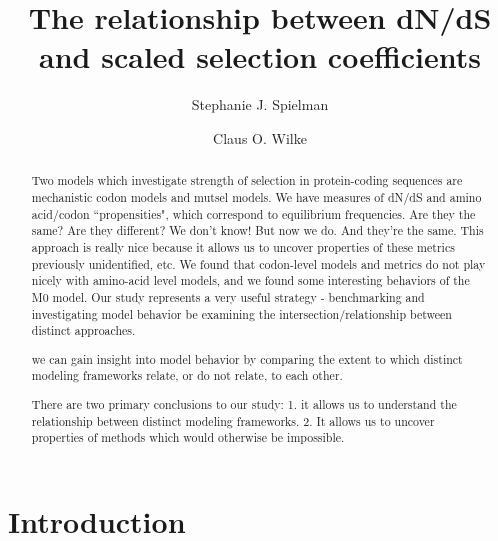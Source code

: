 \documentclass{pnastwo}
\begin{document}
	
	
\title{The relationship between dN/dS and scaled selection coefficients}

\author{Stephanie J. Spielman
	\and
	Claus O. Wilke}


\maketitle



\newpage
\begin{abstract}
Two models which investigate strength of selection in protein-coding sequences are mechanistic codon models and mutsel models. We have measures of dN/dS and amino acid/codon ``propensities", which correspond to equilibrium frequencies. Are they the same? Are they different? We don't know! But now we do. And they're the same. This approach is really nice because it allows us to uncover properties of these metrics previously unidentified, etc. We found that codon-level models and metrics do not play nicely with amino-acid level models, and we found some interesting behaviors of the M0 model. Our study represents a very useful strategy - benchmarking and investigating model behavior be examining the intersection/relationship between distinct approaches.
  
  we can gain insight into model behavior by comparing the extent to which distinct modeling frameworks relate, or do not relate, to each other.
  
  
  There are two primary conclusions to our study: 1. it allows us to understand the relationship between distinct modeling frameworks. 2. It allows us to uncover properties of methods which would otherwise be impossible.

\end{abstract}


\section*{Introduction}
\end{document}
